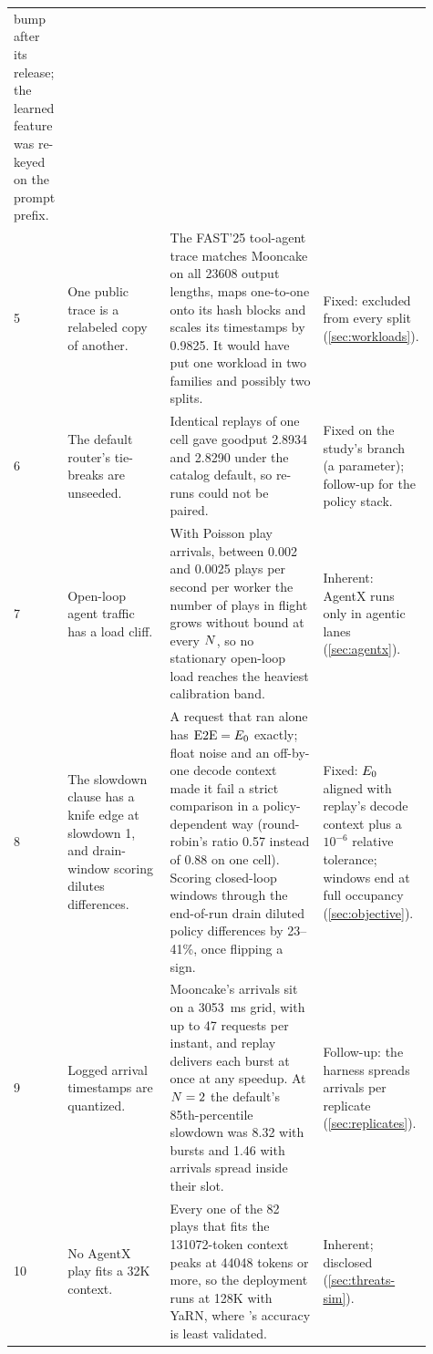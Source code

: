 {\begin{longtable}{@{}P{0.04\linewidth}P{0.26\linewidth}P{0.41\linewidth}P{0.2\linewidth}@{}}
  bump after its release; the learned feature was re-keyed on the prompt prefix. \\
5 & One public trace is a relabeled copy of another. &
  The FAST'25 tool-agent trace matches Mooncake on all \num{23608} output lengths, maps one-to-one
  onto its hash blocks and scales its timestamps by 0.9825. It would have put one workload in two
  families and possibly two splits. & Fixed: excluded from every split (\cref{sec:workloads}). \\
6 & The default router's tie-breaks are unseeded. &
  Identical replays of one cell gave goodput 2.8934 and 2.8290 under the catalog default, so
  re-runs could not be paired. &
  Fixed on the study's branch (a  parameter); follow-up for the policy stack. \\
7 & Open-loop agent traffic has a load cliff. &
  With Poisson play arrivals, between 0.002 and 0.0025 plays per second per worker the number of
  plays in flight grows without bound at every $N$, so no stationary open-loop load reaches the
  heaviest calibration band. & Inherent: AgentX runs only in agentic lanes
  (\cref{sec:agentx}). \\
8 & The slowdown clause has a knife edge at slowdown 1, and drain-window scoring dilutes
  differences. &
  A request that ran alone has $\mathrm{E2E} = E_0$ exactly; float noise and an off-by-one decode
  context made it fail a strict comparison in a policy-dependent way (round-robin's ratio 0.57
  instead of 0.88 on one cell). Scoring closed-loop windows through the end-of-run drain diluted
  policy differences by 23--41\%, once flipping a sign. &
  Fixed: $E_0$ aligned with replay's decode context plus a $10^{-6}$ relative tolerance; windows
  end at full occupancy (\cref{sec:objective}). \\
9 & Logged arrival timestamps are quantized. &
  Mooncake's arrivals sit on a \SI{3053}{ms} grid, with up to 47 requests per instant, and replay
  delivers each burst at once at any speedup. At $N = 2$ the default's 85th-percentile slowdown
  was 8.32 with bursts and 1.46 with arrivals spread inside their slot. &
  Follow-up: the harness spreads arrivals per replicate (\cref{sec:replicates}). \\
10 & No AgentX play fits a 32K context. &
  Every one of the 82 plays that fits the \num{131072}-token context peaks at \num{44048} tokens or
  more, so the deployment runs at 128K with YaRN, where \ais{}'s accuracy is least validated. &
  Inherent; disclosed (\cref{sec:threats-sim}). \\

\end{longtable}}
